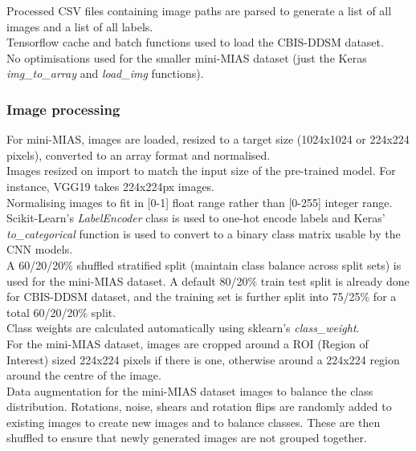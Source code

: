 Processed CSV files containing image paths are parsed to generate a list of all images and a list of all labels.\\

Tensorflow cache and batch functions used to load the CBIS-DDSM dataset.\\

No optimisations used for the smaller mini-MIAS dataset (just the Keras \textit{img\_to\_array} and \textit{load\_img} functions).\\


\subsubsection{Image processing}

For mini-MIAS, images are loaded, resized to a target size (1024x1024 or 224x224 pixels), converted to an array format and normalised.\\

Images resized on import to match the input size of the pre-trained model. For instance, VGG19 takes 224x224px images.\\

Normalising images to fit in [0-1] float range rather than [0-255] integer range.\\

Scikit-Learn's \textit{LabelEncoder} class is used to one-hot encode labels and Keras' \textit{to\_categorical}  function is used to convert to a binary class matrix usable by the CNN models.\\

A 60/20/20\% shuffled stratified split (maintain class balance across split sets) is used for the mini-MIAS dataset. A default 80/20\% train test split is already done for CBIS-DDSM dataset, and the training set is further split into 75/25\% for a total 60/20/20\% split.\\

Class weights are calculated automatically using sklearn's \textit{class\_weight}.\\

For the mini-MIAS dataset, images are cropped around a ROI (Region of Interest) sized 224x224 pixels if there is one, otherwise around a 224x224 region around the centre of the image.\\

Data augmentation for the mini-MIAS  dataset images to balance the class distribution. Rotations, noise, shears and rotation flips are randomly added to existing images to create new images and to balance classes. These are then shuffled to ensure that newly generated images are not grouped together.

